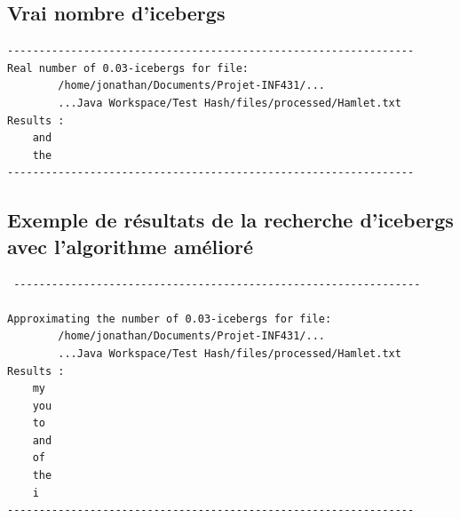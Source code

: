 \documentclass[12pt,a4paper,titlepage]{article}
\begin{document}
\subsection*{Vrai nombre d'icebergs}
\label{exemple:icebergsBenchmark}

\begin{verbatim}
----------------------------------------------------------------
Real number of 0.03-icebergs for file:
        /home/jonathan/Documents/Projet-INF431/...
        ...Java Workspace/Test Hash/files/processed/Hamlet.txt	
Results :
    and
    the
----------------------------------------------------------------
\end{verbatim}

\newpage
\subsection*{Exemple de résultats de la recherche d'icebergs avec l'algorithme amélioré}
\label{exemple:icebergsImproved}
 
 \begin{verbatim}
 ----------------------------------------------------------------

Approximating the number of 0.03-icebergs for file:
        /home/jonathan/Documents/Projet-INF431/...
        ...Java Workspace/Test Hash/files/processed/Hamlet.txt
Results :
    my
    you
    to
    and
    of
    the
    i
----------------------------------------------------------------
 \end{verbatim}
 
 
\end{document}
